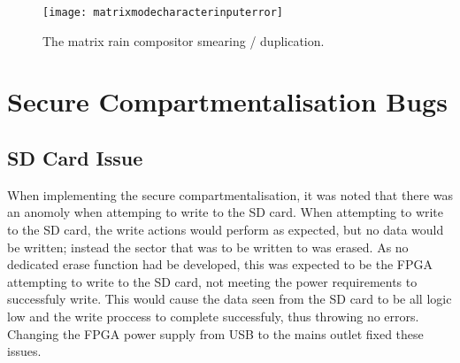 \begin{figure}
  \centering
  \texttt{[image: matrixmodecharacterinputerror]}
  \caption{The matrix rain compositor smearing / duplication.}
  \label{fig:matrixmodecharacterinputerror}
\end{figure}


\section{Secure Compartmentalisation Bugs}

\label{Ch7 Sec2}

\subsection{SD Card Issue}

\label{Ch7 Sec2 Sub1}

When implementing the secure compartmentalisation, it was noted that there was an anomoly when attemping to write to the SD card. When attempting to write to the SD card, the write actions would perform as expected, but no data would be written; instead the sector that was to be written to was erased. As no dedicated erase function had be developed, this was expected to be the FPGA attempting to write to the SD card, not meeting the power requirements to successfuly write. This would cause the data seen from the SD card to be all logic low and the write proccess to complete successfuly, thus throwing no errors. Changing the FPGA power supply from USB to the mains outlet fixed these issues.

